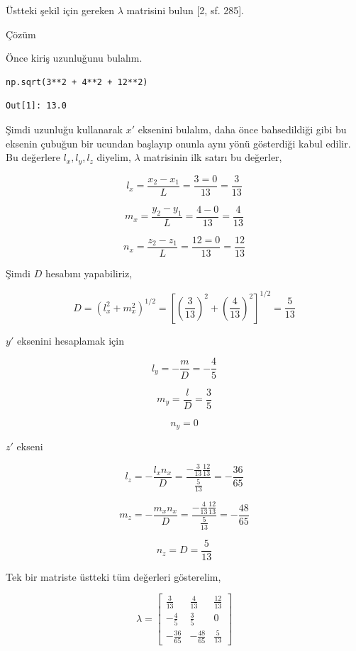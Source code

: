 \documentclass[12pt,fleqn]{article}\usepackage{../../common}
\begin{document}
Üstteki şekil için gereken $\lambda$ matrisini bulun [2, sf. 285].

Çözüm

Önce kiriş uzunluğunu bulalım.

\begin{verbatim}
np.sqrt(3**2 + 4**2 + 12**2)
\end{verbatim}

\begin{verbatim}
Out[1]: 13.0
\end{verbatim}

Şimdi uzunluğu kullanarak $x'$ eksenini bulalım, daha önce bahsedildiği gibi bu
eksenin çubuğun bir ucundan başlayıp onunla aynı yönü gösterdiği kabul edilir.
Bu değerlere $l_x,l_y,l_z$ diyelim, $\lambda$ matrisinin ilk satırı bu değerler,

$$
l_x = \frac{x_2 - x_1}{L} = \frac{3 = 0}{13} = \frac{3}{13}
$$

$$
m_x = \frac{y_2 - y_1}{L} = \frac{4-0}{13} = \frac{4}{13}
$$

$$
n_x = \frac{z_2 - z_1}{L} = \frac{12 = 0}{13} = \frac{12}{13}
$$

Şimdi $D$ hesabını yapabiliriz,

$$
D = (l_x^2 + m_x^2)^{1/2} =
\left[
  \left(\frac{3}{13}\right)^2 +
  \left(\frac{4}{13}\right)^2
\right]^{1/2} = \frac{5}{13}
$$

$y'$ eksenini hesaplamak için

$$
l_y = -\frac{m}{D} = -\frac{4}{5}
$$

$$
m_y = \frac{l}{D} = \frac{3}{5}
$$

$$
n_y = 0
$$

$z'$ ekseni

$$
l_z = -\frac{l_x n_x}{D} =
\frac{-\frac{3}{13} \frac{12}{13}}{\frac{5}{13}} =
- \frac{36}{65}
$$

$$
m_z =
-\frac{m_x n_x}{D} =
\frac{-\frac{4}{13} \frac{12}{13}}{\frac{5}{13}} =
-\frac{48}{65}
$$

$$
n_z = D = \frac{5}{13}
$$

Tek bir matriste üstteki tüm değerleri gösterelim,

$$
\renewcommand*{\arraystretch}{1.8}
\lambda = \left[\begin{array}{ccc}
\frac{3}{13} & \frac{4}{13} & \frac{12}{13} \\
-\frac{4}{5} & \frac{3}{5} & 0 \\
-\frac{36}{65} & -\frac{48}{65} & \frac{5}{13}
\end{array}\right]
$$
\end{document}
